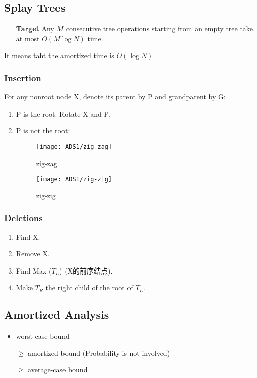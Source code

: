 \subsection{Splay Trees}

\begin{itemize}
    \item [\textbf{Target}] Any $M$ consecutive tree operations starting from an empty tree take at most $O(M\log N)$ time. 
\end{itemize}

It means taht the amortized time is $O(\log N)$. 

\subsubsection{Insertion}
For any nonroot node X, denote its parent by P and grandparent by G: 
\begin{enumerate}
    \item P is the root: Rotate X and P. 
    \item P is not the root:
    \begin{figure}[H]
        \centering
        \begin{minipage}{0.309\textwidth}
            \centering
            \texttt{[image: ADS1/zig-zag]}
            \caption{zig-zag}
        \end{minipage}
        \begin{minipage}{0.309\textwidth}
            \centering
            \texttt{[image: ADS1/zig-zig]}
            \caption{zig-zig}
        \end{minipage}
    \end{figure}
\end{enumerate}

\subsubsection{Deletions}
\begin{enumerate}
    \item Find X. 
    \item Remove X. 
    \item Find Max ($T_L$) (X的前序结点). 
    \item Make $T_R$ the right child of the root of $T_L$. 
\end{enumerate}

\subsection{Amortized Analysis}
\begin{itemize}
    \item worst-case bound
    \item [$\ge$] amortized bound (Probability is not involved)
    \item [$\ge$] average-case bound
\end{itemize}

